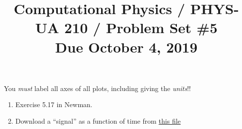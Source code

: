\documentclass[11pt, preprint]{aastex}
\begin{document}
\title{\bf Computational Physics / PHYS-UA 210 / Problem Set \#5
\\ Due October 4, 2019 }

You {\it must} label all axes of all plots, including giving the {\it
  units}!!

\begin{enumerate}
  \item Exercise 5.17 in Newman.
  \item Download a ``signal'' as a function of time from
    \href{}{this file}
\end{enumerate}
\end{document}
